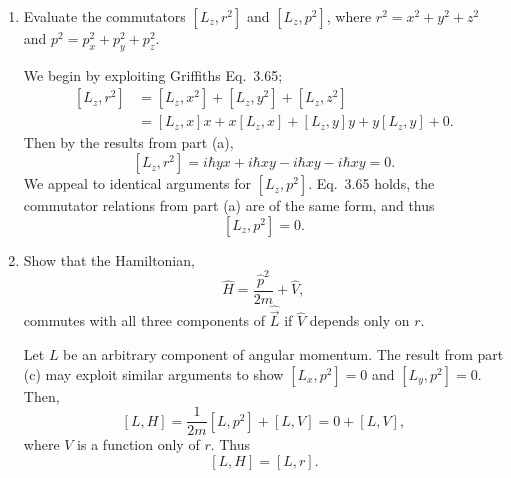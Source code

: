 \documentclass[a4paper, 12pt]{config/homework}
\begin{document}
\begin{enumerate}
\begin{enumerate}[label=(\alph*)]
\bigskip
\item Evaluate the commutators \([L_z, r^2]\) and \([L_z, p^2]\), where \(r^2 = x^2 + y^2 + z^2\) and \(p^2 = p^2_x + p^2_y + p^2_z\). \bigskip

We begin by exploiting Griffiths Eq.\ 3.65;
\begin{align*}
\left[L_z, r^2\right] &= \left[L_z, x^2\right] + \left[L_z, y^2\right] + \left[L_z, z^2\right]
\\&= \left[L_z, x\right]x + x\left[L_z, x\right] + \left[L_z, y\right]y + y\left[L_z, y\right] + 0.
\end{align*}
Then by the results from part (a),
\[\left[L_z, r^2\right] = i\hbar yx + i\hbar xy -i\hbar xy - i\hbar xy = 0.\]
We appeal to identical arguments for \(\left[L_z, p^2\right]\). Eq.\ 3.65 holds, the commutator relations from part (a) are of the same form, and thus
\[\left[L_z, p^2\right] = 0.\]

\bigskip
\item Show that the Hamiltonian, \[\hat{H}=\frac{\hat{p}^2}{2m} + \hat{V},\] commutes with all three components of \(\hat{\vec{L}}\) if \(\hat{V}\) depends only on \(r\). \bigskip

Let \(L\) be an arbitrary component of angular momentum. The result from part (c) may exploit similar arguments to show \(\left[L_x,p^2\right]=0\) and \(\left[L_y, p^2\right]=0\). Then,
\[\left[L, H\right] = \frac{1}{2m}\left[L, p^2\right] + \left[L, V\right] = 0 + \left[L, V\right],\]
where \(V\) is a function only of \(r\). Thus
\[\left[L,H\right] = \left[L,r\right].\]

\end{enumerate}
\end{enumerate}
\end{document}

